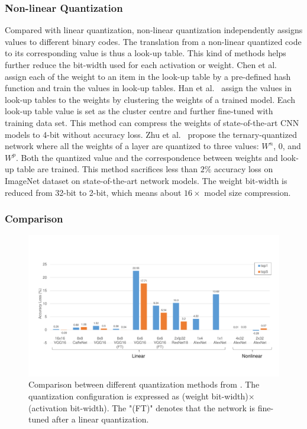\subsubsection{Non-linear Quantization}
Compared with linear quantization, non-linear quantization independently assigns values to different binary codes. The translation from a non-linear quantized code to its corresponding value is thus a look-up table. This kind of methods helps further reduce the bit-width used for each activation or weight. Chen et al.~\cite{chen2015compressing} assign each of the weight to an item in the look-up table by a pre-defined hash function and train the values in look-up tables. Han et al.~\cite{han2015deep} assign the values in look-up tables to the weights by clustering the weights of a trained model. Each look-up table value is set as the cluster centre and further fine-tuned with training data set. This method can compress the weights of state-of-the-art CNN models to 4-bit without accuracy loss. Zhu et al.~\cite{zhu2016trained} propose the ternary-quantized network where all the weights of a layer are quantized to three values: $W^n$, 0, and $W^p$. Both the quantized value and the correspondence between weights and look-up table are trained. This method sacrifices less than $2\%$ accuracy loss on ImageNet dataset on state-of-the-art network models. The weight bit-width is reduced from 32-bit to 2-bit, which means about $16\times$ model size compression.

\subsubsection{Comparison}
\begin{figure}[ht]
    \centering
    \includegraphics[width=1.0\columnwidth]{fig/quantization.pdf}
    \caption{Comparison between different quantization methods from \cite{qiu2016going, guo2017angel, han2015deep, zhu2016trained, zhou2016dorefa, li2016ternary}. The quantization configuration is expressed as (weight bit-width)$\times$(activation bit-width). The "(FT)" denotes that the network is fine-tuned after a linear quantization.}
    \label{fig:quantization}
\end{figure}

